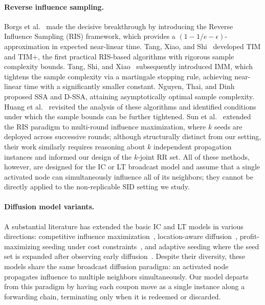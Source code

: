 \documentclass[sigconf]{acmart}
\begin{document}
\paragraph{Reverse influence sampling.}
Borgs et al.~\cite{borgs2014maximizing} made the decisive breakthrough by introducing the Reverse Influence Sampling (RIS) framework, which provides a $(1-1/e-\epsilon)$-approximation in expected near-linear time. Tang, Xiao, and Shi~\cite{tang2014influence} developed TIM and TIM+, the first practical RIS-based algorithms with rigorous sample complexity bounds. Tang, Shi, and Xiao~\cite{tang2015influence} subsequently introduced IMM, which tightens the sample complexity via a martingale stopping rule, achieving near-linear time with a significantly smaller constant. Nguyen, Thai, and Dinh~\cite{nguyen2016stop} proposed SSA and D-SSA, attaining asymptotically optimal sample complexity. Huang et al.~\cite{huang2017revisiting} revisited the analysis of these algorithms and identified conditions under which the sample bounds can be further tightened. Sun et al.~\cite{sun2018multi} extended the RIS paradigm to multi-round influence maximization, where $k$ seeds are deployed across successive rounds; although structurally distinct from our setting, their work similarly requires reasoning about $k$ independent propagation instances and informed our design of the $k$-joint RR set. All of these methods, however, are designed for the IC or LT broadcast model and assume that a single activated node can simultaneously influence all of its neighbors; they cannot be directly applied to the non-replicable SID setting we study.

\paragraph{Diffusion model variants.}
A substantial literature has extended the basic IC and LT models in various directions: competitive influence maximization~\cite{budak2011limiting}, location-aware diffusion~\cite{li2014efficient}, profit-maximizing seeding under cost constraints~\cite{lu2015competition}, and adaptive seeding where the seed set is expanded after observing early diffusion~\cite{seeman2013adaptive}. Despite their diversity, these models share the same broadcast diffusion paradigm: an activated node propagates influence to multiple neighbors simultaneously. Our model departs from this paradigm by having each coupon move as a single instance along a forwarding chain, terminating only when it is redeemed or discarded.
\end{document}
